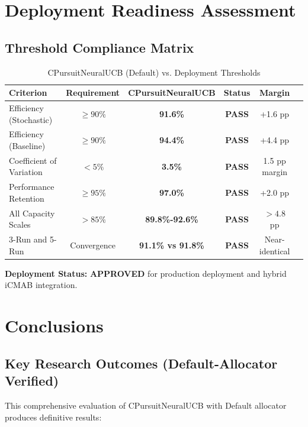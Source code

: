 \documentclass[12pt,a4paper]{article}
\newcommand{\success}[1]{\textcolor{accentgreen}{\textbf{#1}}}
\begin{document}
\section{Deployment Readiness Assessment}

\subsection{Threshold Compliance Matrix}

\begin{table}[H]
\centering
\caption{CPursuitNeuralUCB (Default) vs. Deployment Thresholds}
\begin{tabular}{@{}lccccc@{}}
\toprule
\textbf{Criterion} & \textbf{Requirement} & \textbf{CPursuitNeuralUCB} & \textbf{Status} & \textbf{Margin} \\
\midrule
Efficiency (Stochastic) & $\geq 90\%$ & \success{91.6\%} & \success{PASS} & +1.6 pp \\
Efficiency (Baseline) & $\geq 90\%$ & \success{94.4\%} & \success{PASS} & +4.4 pp \\
Coefficient of Variation & $< 5\%$ & \success{3.5\%} & \success{PASS} & 1.5 pp margin \\
Performance Retention & $\geq 95\%$ & \success{97.0\%} & \success{PASS} & +2.0 pp \\
All Capacity Scales & $> 85\%$ & \success{89.8\%-92.6\%} & \success{PASS} & $>4.8$ pp \\
3-Run and 5-Run & Convergence & \success{91.1\% vs 91.8\%} & \success{PASS} & Near-identical \\
\bottomrule
\end{tabular}
\end{table}

\textbf{Deployment Status:} \success{\textbf{APPROVED}} for production deployment and hybrid iCMAB integration.

\section{Conclusions}

\subsection{Key Research Outcomes (Default-Allocator Verified)}

This comprehensive evaluation of CPursuitNeuralUCB with Default allocator produces definitive results:
\end{document}
